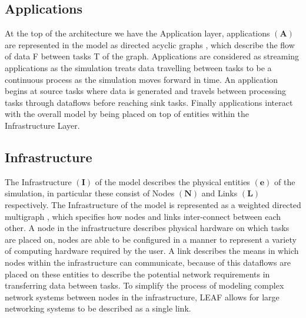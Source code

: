 \documentclass{l4proj}
\begin{document}
\subsection{Applications}\label{subsec:applications}
At the top of the architecture we have the Application layer, applications $\mathbf{(A)}$ are represented in the model as directed acyclic graphs \citep{leaf2021}, which describe the flow of data F between tasks T of the graph.
Applications are considered as streaming applications as the simulation treats data travelling between tasks to be a continuous process as the simulation moves forward in time.
An application begins at source tasks where data is generated and travels between processing tasks through dataflows before reaching sink tasks.
Finally applications interact with the overall model by being placed on top of entities within the Infrastructure Layer.

\subsection{Infrastructure}\label{subsec:infrastructure}
The Infrastructure $\mathbf{(I)}$ of the model describes the physical entities $\mathbf{(e)}$ of the simulation, in particular these consist of Nodes $\mathbf{(N)}$ and Links $\mathbf{(L)}$ respectively.
The Infrastructure of the model is represented as a weighted directed multigraph \citep{leaf2021}, which specifies how nodes and links inter-connect between each other.
A node in the infrastructure describes physical hardware on which tasks are placed on, nodes are able to be configured in a manner to represent a variety of computing hardware required by the user.
A link describes the means in which nodes within the infrastructure can communicate, because of this dataflows are placed on these entities to describe the potential network requirements in transferring data between tasks.
To simplify the process of modeling complex network systems between nodes in the infrastructure, LEAF allows for large networking systems to be described as a single link.
\end{document}
